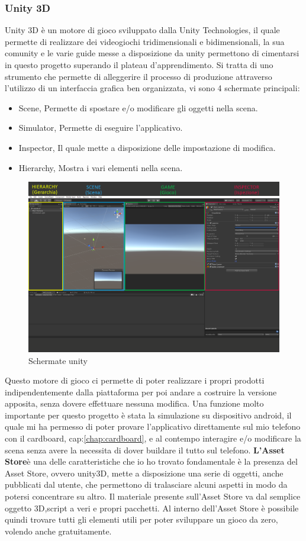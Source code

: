 \documentclass[10pt,a4paper]{article}
\begin{document}
    \subsubsection{Unity 3D}\label{unity3D}
    Unity 3D è un motore di gioco sviluppato dalla Unity
    Technologies, il quale permette di realizzare dei videogiochi tridimensionali e bidimensionali, la sua comunity e le varie guide messe a disposizione da unity permettono di cimentarsi in questo progetto superando il plateau d'apprendimento.
    Si tratta di uno strumento che permette di alleggerire il processo di produzione attraverso l'utilizzo di un interfaccia grafica ben organizzata, vi sono 4 schermate principali:
    \begin{itemize}
    	\item Scene, Permette di spostare e/o modificare gli oggetti nella scena.
    	\item Simulator, Permette di eseguire l'applicativo.
    	\item Inspector, Il quale mette a disposizione delle impostazione di modifica.
    	\item Hierarchy, Mostra i vari elementi nella scena.
    \end{itemize}
    \begin{figure}[H]
    	\centering
    	\includegraphics[width=0.8\linewidth]{image/unity}
    	\caption{Schermate unity}
    	\label{fig:unity}
    \end{figure}
    Questo motore di gioco ci permette di poter realizzare i propri prodotti indipendentemente dalla piattaforma per poi andare a costruire la versione apposita, senza dovere effettuare nessuna modifica.
    Una funzione molto importante per questo progetto è stata la simulazione su dispositivo android, il quale mi ha permesso di poter provare l'applicativo direttamente sul mio telefono con il cardboard, cap:\ref{chap:cardboard}, e al contempo interagire e/o modificare la scena senza avere la necessita di dover buildare il tutto sul telefono.
    \textbf{L'Asset Store}è una delle caratteristiche che io ho trovato fondamentale è la presenza del Asset Store, ovvero unity3D, mette a disposizione una serie di oggetti, anche pubblicati dal utente, che permettono di tralasciare alcuni aspetti in modo da potersi concentrare su altro.
    Il materiale presente sull'Asset Store va dal semplice oggetto 3D,script a veri e propri pacchetti.
    Al interno dell'Asset Store è possibile quindi trovare tutti gli elementi utili per poter sviluppare un gioco da zero, volendo anche gratuitamente.
\end{document}
